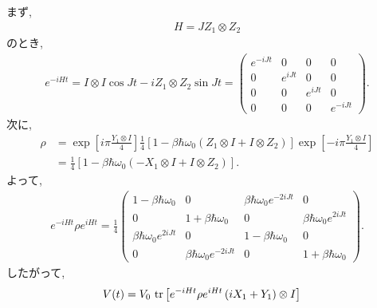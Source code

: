 \begin{ex}
    \label{ex7.37}
    まず,
    \begin{align*}
        H = J Z_1 \otimes Z_2
    \end{align*}
    のとき,
    \begin{align*}
        e^{-iHt} = I \otimes I \cos Jt - i Z_1 \otimes Z_2 \sin Jt
        =
        \begin{pmatrix}
            e^{-i Jt} & 0       & 0       & 0        \\
            0         & e^{iJt} & 0       & 0        \\
            0         & 0       & e^{iJt} & 0        \\
            0         & 0       & 0       & e^{-iJt}
        \end{pmatrix}.
    \end{align*}
    次に,
    \begin{align*}
        \rho & =
        \exp \left[ i \pi \frac{Y_1 \otimes I}{4} \right]
        \frac{1}{4}
        \left[
            1 - \beta \hbar \omega_0 \left( Z_1 \otimes I + I \otimes Z_2\right) \right]
        \exp \left[ -i \pi \frac{Y_1 \otimes I}{4} \right]
        \\
             & =
        \frac{1}{4}
        \left[
            1 - \beta \hbar \omega_0 \left( - X_1 \otimes I + I \otimes Z_2\right) \right].
    \end{align*}
    よって,
    \begin{align*}
        e^{-iHt} \rho e^{iHt}
        =
        \frac{1}{4}
        \begin{pmatrix}
            1 - \beta \hbar \omega_0      & 0                              & \beta \hbar \omega_0 e^{-2iJt} & 0                             \\
            0                             & 1+\beta \hbar \omega_0         & 0                              & \beta \hbar \omega_0 e^{2iJt} \\
            \beta \hbar \omega_0 e^{2iJt} & 0                              & 1 - \beta \hbar \omega_0       & 0                             \\
            0                             & \beta \hbar \omega_0 e^{-2iJt} & 0                              & 1 + \beta\hbar \omega_0
        \end{pmatrix}.
    \end{align*}
    したがって,
    \begin{align*}
        V(t)
         & = V_0 \ \tr \left[  e^{-iHt} \rho e^{iHt} \left( i X_1 + Y_1\right) \otimes I \right]

\end{align*}
\end{ex}
